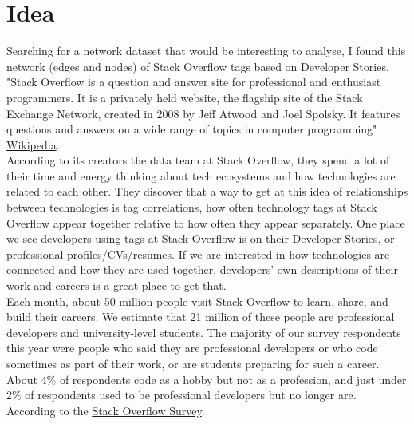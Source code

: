 \documentclass[12pt]{article}
\begin{document}
\section{Idea}
	Searching for a network dataset that would be interesting to analyse, I found this network (edges and nodes) of Stack Overflow tags based on Developer Stories. "Stack Overflow is a question and answer site for professional and enthusiast programmers. It is a privately held website, the flagship site of the Stack Exchange Network, created in 2008 by Jeff Atwood and Joel Spolsky. It features questions and answers on a wide range of topics in computer programming" \href{https://en.wikipedia.org/wiki/Stack_Overflow}{Wikipedia}. \\
	According to its creators the data team at Stack Overflow, they spend a lot of their time and energy thinking about tech ecosystems and how technologies are related to each other. They discover that a way to get at this idea of relationships between technologies is tag correlations, how often technology tags at Stack Overflow appear together relative to how often they appear separately. One place we see developers using tags at Stack Overflow is on their Developer Stories, or professional profiles/CVs/resumes. If we are interested in how technologies are connected and how they are used together, developers' own descriptions of their work and careers is a great place to get that.\\
	Each month, about 50 million people visit Stack Overflow to learn, share, and build their careers. We estimate that 21 million of these people are professional developers and university-level students. The majority of our survey respondents this year were people who said they are professional developers or who code sometimes as part of their work, or are students preparing for such a career. About 4\% of respondents code as a hobby but not as a profession, and just under 2\% of respondents used to be professional developers but no longer are. According to the  \href{https://insights.stackoverflow.com/survey/2019#key-resultsl}{Stack Overflow Survey}.
\end{document}
